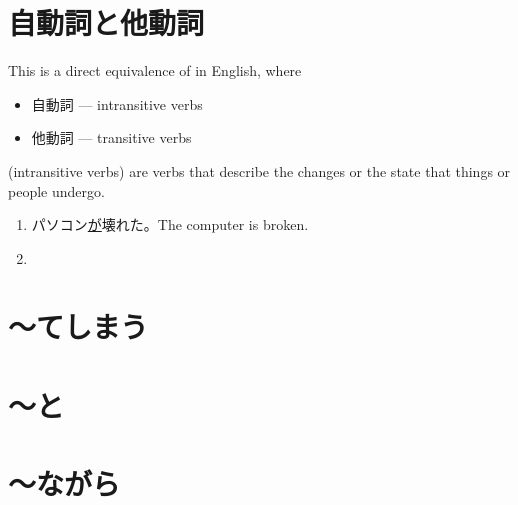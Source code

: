 \documentclass[notoc,notitlepage]{tufte-book}
\begin{document}

\section{自動詞と他動詞}%
\label{sec:jidoushi_to_tadoushi}

This is a direct equivalence of  in English, where
\begin{itemize}
  \item 自動詞 --- intransitive verbs
  \item 他動詞 --- transitive verbs
\end{itemize}

\begin{defn}[自動詞]\label{defn:jidoushi}
   (intransitive verbs) are verbs that describe the changes or
  the state that things or people undergo.
\end{defn}

\begin{eg}
  \begin{enumerate}
    \item パソコン\underline{が}壊れた。The computer is broken.
    \item 
  \end{enumerate}
\end{eg}


\section{〜てしまう}%
\label{sec:_teshimau}




\section{〜と}%
\label{sec:_to}




\section{〜ながら}%
\label{sec:_nagara}



\end{document}
